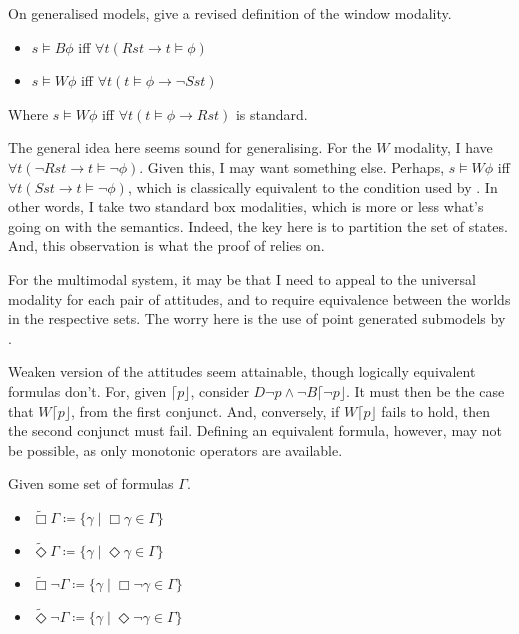 \documentclass[10pt]{article}
\newcommand{\lattn}{\ensuremath{\lceil}}
\newcommand{\rattn}{\ensuremath{\rfloor}}
\newcommand{\attn}[1]{\ensuremath{\mathord{\lattn{#1}\rattn}}}
\begin{document}
On generalised models, \citeauthor{Gargov:1987aa} give a revised definition of the window modality.

\begin{itemize}
\item \(s \vDash B\phi\) iff \(\forall t(Rst \rightarrow t \vDash \phi)\)
\item \(s \vDash W\phi\) iff \(\forall t(t \vDash \phi \rightarrow \lnot Sst)\)
\end{itemize}

Where \(s \vDash W\phi\) iff \(\forall t(t \vDash \phi \rightarrow Rst)\) is standard.

The general idea here seems sound for generalising.
For the \(W\) modality, I have \(\forall t(\lnot Rst \rightarrow t \vDash \lnot\phi)\).
Given this, I may want something else.
Perhaps, \(s \vDash W\phi \) iff \(\forall t(Sst \rightarrow t \vDash \lnot\phi)\), which is classically equivalent to the condition used by \citeauthor{Gargov:1987aa}.
In other words, I take two standard box modalities, which is more or less what's going on with the semantics.
Indeed, the key here is to partition the set of states.
And, this observation is what the proof of \citeauthor{Gargov:1987aa} relies on.

For the multimodal system, it may be that I need to appeal to the universal modality for each pair of attitudes, and to require equivalence between the worlds in the respective sets.
The worry here is the use of point generated submodels by \citeauthor{Gargov:1987aa}.

\begin{note}
  Weaken version of the attitudes seem attainable, though logically equivalent formulas don't.
  For, given \(\attn{p}\), consider \(D\lnot p \land \lnot B\attn{\lnot p}\).
  It must then be the case that \(W\attn{p}\), from the first conjunct.
  And, conversely, if \(W\attn{p}\) fails to hold, then the second conjunct must fail.
  Defining an equivalent formula, however, may not be possible, as only monotonic operators are available.
\end{note}

\begin{definition}
  Given some set of formulas \(\Gamma\).
  \begin{itemize}
  \item \(\widetilde{\Box}\Gamma \coloneq \{ \gamma \mid \Box\gamma \in \Gamma \}\)
  \item \(\widetilde{\Diamond}\Gamma \coloneq \{ \gamma \mid \Diamond\gamma \in \Gamma \}\)
  \item \(\widetilde{\Box}\lnot\Gamma \coloneq \{ \gamma \mid \Box\lnot\gamma \in \Gamma \}\)
  \item \(\widetilde{\Diamond}\lnot\Gamma \coloneq \{ \gamma \mid \Diamond\lnot\gamma \in \Gamma \}\)
  \end{itemize}
\end{definition}
\end{document}
